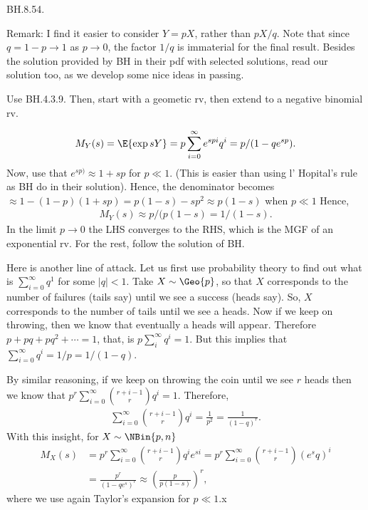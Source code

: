 
\setcounter{theorem}{53}
\begin{exercise} BH.8.54.

Remark: I find it easier to consider $Y=pX$, rather than $pX/q$. Note that since $q=1-p\to 1$ as $p\to 0$, the factor $1/q$ is immaterial for the final result.
Besides the solution provided by BH in their pdf with selected solutions, read our solution too, as we develop some nice ideas in passing.

\begin{hint}
Use BH.4.3.9. Then, start with a geometic rv, then extend to a negative binomial rv.
\end{hint}
\begin{solution}
\begin{align*}
M_{Y}(s) =\E{\exp{s Y}} = p \sum_{i=0}^{\infty} e^{s p i} q^{i} = p/(1-qe^{sp}).
\end{align*}
Now, use that $e^{s p)} \approx 1 + s p$ for $p\ll 1$. (This is easier than using l' Hopital's rule as BH do in their solution). Hence, the denominator becomes $\approx 1-(1-p)(1+sp) = p(1-s) - sp^{2} \approx p(1-s)$ when $p\ll 1$ Hence,
\begin{align*}
M_{Y}(s) \approx p/(p(1-s) =  1/(1-s).
\end{align*}
In the limit $p\to 0$ the LHS converges to the RHS, which is the MGF of an exponential rv. For the rest, follow the solution of BH.

Here is another line of attack. Let us first use probability theory to find out what is $\sum_{i=0}^{\infty} q^{1}$ for some $|q|<1$. Take $X\sim\Geo{p}$, so that $X$ corresponds to the number of failures (tails say) until we see a success (heads say). So, $X$ corresponds to the number of tails until we see a heads. Now if we keep on throwing, then we know that eventually a heads will appear. Therefore $p + pq +pq^2 + \cdots = 1$, that, is $p\sum_i^{\infty} q^{i}=1$. But this implies that $\sum_{i=0}^{\infty}q^i = 1/ p = 1/(1-q)$.

By similar reasoning, if we keep on throwing the coin until we see $r$ heads then we know that $p^r \sum_{i=0}^{\infty} {r+i-1 \choose r} q^{i} = 1$.  Therefore,
\begin{align*}
\sum_{i=0}^{\infty} {r+i-1 \choose r} q^{i} =  \frac{1}{p^{2}}= \frac{1}{(1-q)^{r}}.
\end{align*}
With this insight, for $X\sim\NBin{p,n}$
\begin{align*}
  M_X(s) &= p^r \sum_{i=0}^{\infty} {r+i-1 \choose r} q^{i} e^{si}
 = p^r \sum_{i=0}^{\infty} {r+i-1 \choose r} (e^{s}q)^{i} \\
  &= \frac{p^r}{(1-qe^{s})^{r}} \approx \left(\frac{p}{p(1-s)}\right)^{r},
\end{align*}
where we use again Taylor's expansion for $p\ll 1$.x
\end{solution}
\end{exercise}

